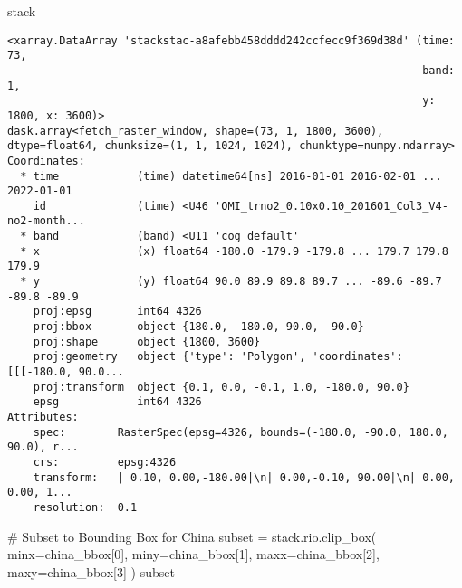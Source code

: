 \documentclass[
  letterpaper,
  DIV=11,
  numbers=noendperiod]{scrreprt}
\newenvironment{Shaded}{\begin{snugshade}}{\end{snugshade}}
\newcommand{\CommentTok}[1]{\textcolor[rgb]{0.37,0.37,0.37}{#1}}
\newcommand{\DecValTok}[1]{\textcolor[rgb]{0.68,0.00,0.00}{#1}}
\newcommand{\NormalTok}[1]{\textcolor[rgb]{0.00,0.46,0.62}{#1}}
\newcommand{\OperatorTok}[1]{\textcolor[rgb]{0.37,0.37,0.37}{#1}}
\begin{document}
\begin{Shaded}
\begin{Highlighting}[]
\NormalTok{stack}
\end{Highlighting}
\end{Shaded}

\begin{verbatim}
<xarray.DataArray 'stackstac-a8afebb458dddd242ccfecc9f369d38d' (time: 73,
                                                                band: 1,
                                                                y: 1800, x: 3600)>
dask.array<fetch_raster_window, shape=(73, 1, 1800, 3600), dtype=float64, chunksize=(1, 1, 1024, 1024), chunktype=numpy.ndarray>
Coordinates:
  * time            (time) datetime64[ns] 2016-01-01 2016-02-01 ... 2022-01-01
    id              (time) <U46 'OMI_trno2_0.10x0.10_201601_Col3_V4-no2-month...
  * band            (band) <U11 'cog_default'
  * x               (x) float64 -180.0 -179.9 -179.8 ... 179.7 179.8 179.9
  * y               (y) float64 90.0 89.9 89.8 89.7 ... -89.6 -89.7 -89.8 -89.9
    proj:epsg       int64 4326
    proj:bbox       object {180.0, -180.0, 90.0, -90.0}
    proj:shape      object {1800, 3600}
    proj:geometry   object {'type': 'Polygon', 'coordinates': [[[-180.0, 90.0...
    proj:transform  object {0.1, 0.0, -0.1, 1.0, -180.0, 90.0}
    epsg            int64 4326
Attributes:
    spec:        RasterSpec(epsg=4326, bounds=(-180.0, -90.0, 180.0, 90.0), r...
    crs:         epsg:4326
    transform:   | 0.10, 0.00,-180.00|\n| 0.00,-0.10, 90.00|\n| 0.00, 0.00, 1...
    resolution:  0.1
\end{verbatim}

\begin{Shaded}
\begin{Highlighting}[]
\CommentTok{\# Subset to Bounding Box for China}
\NormalTok{subset }\OperatorTok{=}\NormalTok{ stack.rio.clip\_box(}
\NormalTok{    minx}\OperatorTok{=}\NormalTok{china\_bbox[}\DecValTok{0}\NormalTok{],}
\NormalTok{    miny}\OperatorTok{=}\NormalTok{china\_bbox[}\DecValTok{1}\NormalTok{],}
\NormalTok{    maxx}\OperatorTok{=}\NormalTok{china\_bbox[}\DecValTok{2}\NormalTok{],}
\NormalTok{    maxy}\OperatorTok{=}\NormalTok{china\_bbox[}\DecValTok{3}\NormalTok{]}
\NormalTok{)}
\NormalTok{subset}
\end{Highlighting}
\end{Shaded}
\end{document}
